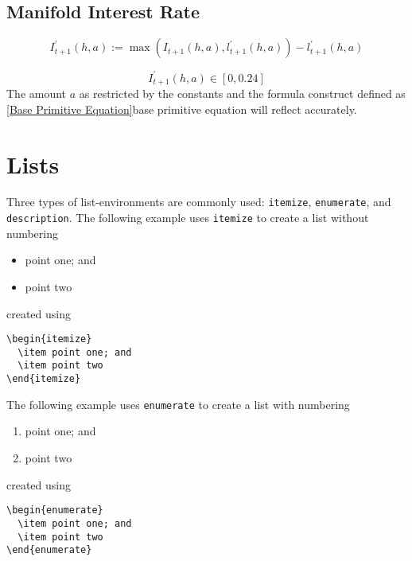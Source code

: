 {{{			
			
			\subsection{Manifold Interest Rate}
			\begin{equation}
				I_{t+1}^{\prime}(h, a):=\max \left(I_{t+1}(h, a), l_{t+1}^{\prime}(h, a)\right)-l_{t+1}^{\prime}(h, a)
			\end{equation}
			
			\begin{equation}
				I_{t+1}^{\prime}(h, a) \in[0,0.24]
			\end{equation}
			The amount $a$ as restricted by the constants and the formula construct defined as \ref{Base Primitive Equation}base primitive equation will reflect accurately.
			
			\section{Lists}\label{sec:lists}
			Three types of list-environments are commonly used: \texttt{itemize}, \texttt{enumerate}, and \texttt{description}. The following example uses \texttt{itemize} to create a list without numbering
			\begin{itemize}
				\item point one; and
				\item point two
			\end{itemize}
			created using
			\begin{verbatim}
\begin{itemize}
  \item point one; and
  \item point two
\end{itemize}
			\end{verbatim}
			
			The following example uses \texttt{enumerate} to create a list with numbering
			\begin{enumerate}
				\item point one; and
				\item point two
			\end{enumerate}
			created using
			\begin{verbatim}
\begin{enumerate}
  \item point one; and
  \item point two
\end{enumerate}
			\end{verbatim}
			
}}}
